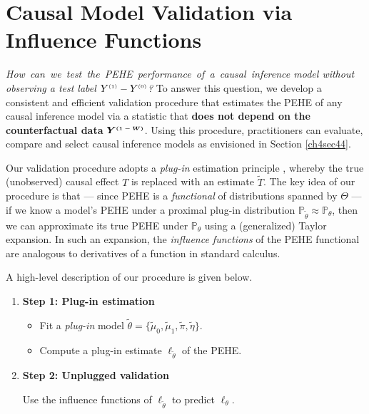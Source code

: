 \documentclass [PhD] {uclathes}
\begin{document}
\section{Causal Model Validation via Influence Functions}  
\label{ch4sec43} 
\textit{How~can~we~test~the~PEHE~performance~of~a~causal~inference model without observing a test label \mbox{\footnotesize $Y^{\mbox{\tiny $(1)$}}-Y^{\mbox{\tiny $(0)$}}$}?} To answer this question, we develop a consistent and efficient validation procedure that estimates the PEHE of any causal inference model via a statistic that {\bf does not depend on the counterfactual data} \mbox{\footnotesize $\boldsymbol{Y^{\mbox{\tiny $(1-W)$}}}$}. Using this procedure, practitioners can evaluate, compare and select causal inference models as envisioned in Section \ref{ch4sec44}.    

Our validation procedure adopts a {\it plug-in} estimation principle \cite{wright2011using}, whereby the true (unobserved) causal effect \mbox{\footnotesize $T$} is replaced with an estimate \mbox{\footnotesize $\widetilde{T}$}. The key idea of our procedure is that --- since PEHE is a {\it functional} of distributions spanned by \mbox{\footnotesize $\Theta$} --- if we know a model's PEHE under a proximal plug-in distribution \mbox{\footnotesize $\mathbb{P}_{\tilde{\theta}} \approx \mathbb{P}_{\theta}$}, then we can approximate its true PEHE under \mbox{\footnotesize $\mathbb{P}_{\theta}$} using a (generalized) Taylor expansion. In such an expansion, the {\it influence functions} of the PEHE functional are analogous to derivatives of a function in standard calculus. 

A high-level description of our procedure is given below.
 
\begin{enumerate}
\item {\bf Step 1: Plug-in estimation}

\begin{itemize}
\item Fit a {\it plug-in} model $\tilde{\theta} = \{\tilde{\mu}_0,\tilde{\mu}_1,\tilde{\pi},\tilde{\eta}\}$.
\item Compute a plug-in estimate $\boldsymbol{\ell}_{\tilde{\theta}}$ of the PEHE.
\end{itemize}

\item {\bf Step 2: Unplugged validation}

Use the influence functions of $\boldsymbol{\ell}_{\tilde{\theta}}$ to predict $\boldsymbol{\ell}_{\theta}$.

\end{enumerate}
\end{document}
